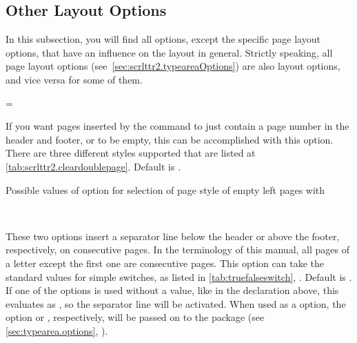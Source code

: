 \subsection{Other Layout Options}
\label{sec:scrlttr2.layout}

In this subsection, you will find all options, except the specific
page layout options, that have an influence on the layout in
general. Strictly speaking, all page layout options
(see~\ref{sec:scrlttr2.typeareaOptions}) are also layout options, and
vice versa for some of them.

\begin{Declaration}
  =
\end{Declaration}
%
If you want pages inserted by the  command to
just contain a page number in the header and footer, or to be empty,
this can be accomplished with this option. There are three different
styles supported that are listed at
\autoref{tab:scrlttr2.cleardoublepage}. Default is .

\begin{table}
  \caption[{Possible values of option  with
    }]{Possible values of option  for
    selection of page style of empty left pages with }
  \label{tab:scrlttr2.cleardoublepage}
  \begin{desctabular}
  \end{desctabular}
\end{table}
%
%

\begin{Declaration}
  \\
\end{Declaration}
%
%
These two options insert a separator line below the header or above
the footer, respectively, on consecutive pages. In the terminology of
this manual, all pages of a letter except the first one are
consecutive pages.  This option can take the standard values for
simple switches, as listed in
\autoref{tab:truefalseswitch},
. Default is
. If one of the options is used without a value, like in
the declaration above, this evaluates as , so the
separator line will be activated. When used as a 
option, the option  or ,
respectively, will be passed on to the  package (see
\autoref{sec:typearea.options},
).
%
%
%

